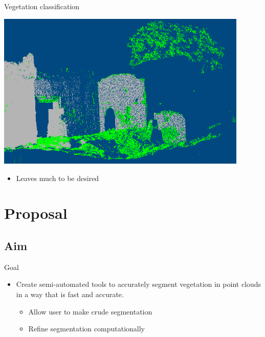 \documentclass[compress]{beamer}
\begin{document}
\begin{frame}{Vegetation classification}

\centering
\includegraphics[width=0.9\textwidth]{pics/vrmesh-veg.png}
\begin{itemize}
\item Leaves much to be desired
\end{itemize}

\end{frame}

\section{Proposal}

\subsection{Aim}

\begin{frame}{Goal}
\begin{itemize}

\item
Create semi-automated tools to accurately segment vegetation in point clouds in a way that is fast and accurate.

\begin{itemize}
\item Allow user to make crude segmentation
\item Refine segmentation computationally
\end{itemize}

\end{itemize}

\end{frame}

%
%
\end{document}
